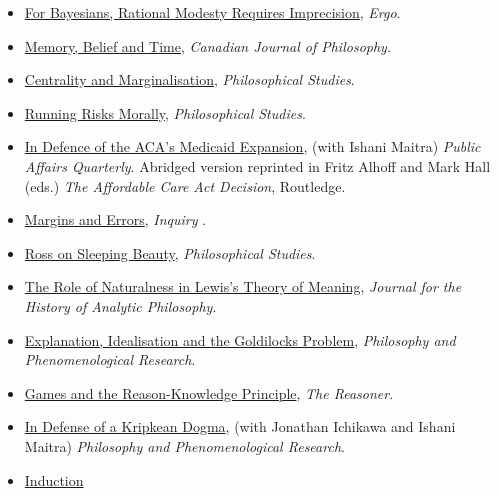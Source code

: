 \documentclass[
  10pt,
  letterpaper,
  DIV=11,
  numbers=noendperiod,
  twoside]{scrartcl}
\begin{document}
\begin{itemize}
\item
  \href{https://brian.weatherson.org/quarto/posts/modesty/for-bayesians-rational-modesty-requires-imprecision.html}{For
  Bayesians, Rational Modesty Requires Imprecision}, \emph{Ergo}.
\item
  \href{https://brian.weatherson.org/quarto/posts/mbt/memory-belief-and-time.html}{Memory,
  Belief and Time}, \emph{Canadian Journal of Philosophy}.
\item
  \href{https://brian.weatherson.org/quarto/posts/herman/centrality-and-marginalisation.html}{Centrality
  and Marginalisation}, \emph{Philosophical Studies}.
\item
  \href{https://brian.weatherson.org/quarto/posts/rrm/running-risks-morally.html}{Running
  Risks Morally}, \emph{Philosophical Studies}.
\item
  \href{https://brian.weatherson.org/quarto/posts/aca/aca-medicaid.html}{In
  Defence of the ACA's Medicaid Expansion}, (with Ishani Maitra)
  \emph{Public Affairs Quarterly}. Abridged version reprinted in Fritz
  Alhoff and Mark Hall (eds.) \emph{The Affordable Care Act Decision},
  Routledge.
\item
  \href{https://brian.weatherson.org/quarto/posts/mae/margins-and-errors.html}{Margins
  and Errors}, \emph{Inquiry} .
\item
  \href{https://brian.weatherson.org/quarto/posts/ross-sleeping-beauty/ross-on-sleeping-beauty.html}{Ross
  on Sleeping Beauty}, \emph{Philosophical Studies}.
\item
  \href{https://brian.weatherson.org/quarto/posts/naturalness/the-role-of-naturalness-in-lewiss-theory-of-meaning.html}{The
  Role of Naturalness in Lewis's Theory of Meaning}, \emph{Journal for
  the History of Analytic Philosophy}.
\item
  \href{https://brian.weatherson.org/quarto/posts/eigp/goldilocks.html}{Explanation,
  Idealisation and the Goldilocks Problem}, \emph{Philosophy and
  Phenomenological Research}.
\item
  \href{https://brian.weatherson.org/quarto/posts/gark/games-and-the-reason-knowledge-principle.html}{Games
  and the Reason-Knowledge Principle}, \emph{The Reasoner}.
\item
  \href{https://brian.weatherson.org/quarto/posts/idakd/in-defense-of-a-kripkean-dogma.html}{In
  Defense of a Kripkean Dogma}, (with Jonathan Ichikawa and Ishani
  Maitra) \emph{Philosophy and Phenomenological Research}.
\item
  \href{https://brian.weatherson.org/quarto/posts/ias/induction-and-supposition.html}{Induction
}
\end{itemize}
\end{document}

